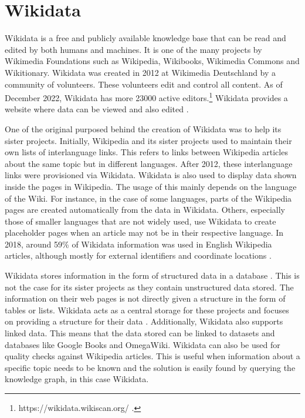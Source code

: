 \section{Wikidata}
Wikidata is a free and publicly available knowledge base that can be read and edited by both humans and machines. It is one of the many projects by Wikimedia Foundations such as Wikipedia, Wikibooks, Wikimedia Commons and Wikitionary.  Wikidata was created in 2012 at Wikimedia Deutschland by a community of volunteers. These volunteers edit and control all content. As of December 2022, Wikidata has more 23000 active editors.\footnote{https://wikidata.wikiscan.org/ .} Wikidata provides a website where data can be viewed and also edited \cite{Foundationa}.

One of the original purposed behind the creation of Wikidata was to help its sister projects. Initially, Wikipedia and its sister projects used to maintain their own lists of interlanguage links. This refers to links between Wikipedia articles about the same topic but in different languages. After 2012, these interlanguage links were provisioned via Wikidata. Wikidata is also used to display data shown inside the pages in Wikipedia. The usage of this mainly depends on the language of the Wiki. For instance, in the case of some languages, parts of the Wikipedia pages are created automatically from the data in Wikidata. Others, especially those of smaller languages that are not widely used, use Wikidata to create placeholder pages when an article may not be in their respective language. In 2018, around 59\% of Wikidata information was used in English Wikipedia articles, although mostly for external identifiers and coordinate locations \cite{Wikipedia2017}. 

Wikidata stores information in the form of structured data in a database \cite{Tharani2021}. This is not the case for its sister projects as they contain unstructured data stored. The information on their web pages is not directly given a structure in the form of tables or lists. Wikidata acts as a central storage for these projects and focuses on providing a structure for their data \cite{Wikidata2014}. Additionally, Wikidata also supports linked data. This means that the data stored can be linked to datasets and databases like Google Books and OmegaWiki. Wikidata can also be used for quality checks against Wikipedia articles. This is useful when information about a specific topic needs to be known and the solution is easily found by querying the knowledge graph, in this case Wikidata.

